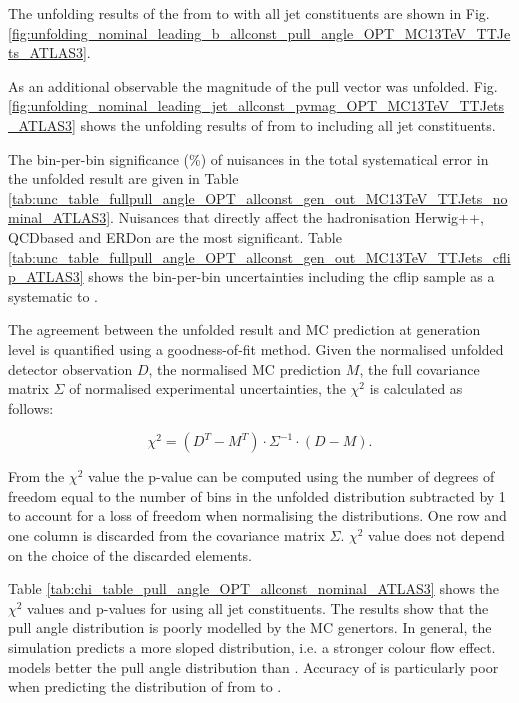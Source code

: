 The unfolding results of the \pullangle from \leadingb to \scndleadingb with all jet constituents are shown in Fig. \ref{fig:unfolding_nominal_leading_b_allconst_pull_angle_OPT_MC13TeV_TTJets_ATLAS3}.

As an additional observable the magnitude of the pull vector \pvmag was unfolded. Fig. \ref{fig:unfolding_nominal_leading_jet_allconst_pvmag_OPT_MC13TeV_TTJets_ATLAS3} shows the unfolding results of \pvmag from \leadingjet to \scndleadingjet including all jet constituents.

The bin-per-bin significance (\%) of nuisances in the total systematical error in the unfolded result are given in Table \ref{tab:unc_table_fullpull_angle_OPT_allconst_gen_out_MC13TeV_TTJets_nominal_ATLAS3}. Nuisances that directly affect the hadronisation \ttbar Herwig++, \ttbar QCDbased and \ttbar ERDon are the most significant. Table \ref{tab:unc_table_fullpull_angle_OPT_allconst_gen_out_MC13TeV_TTJets_cflip_ATLAS3} shows the bin-per-bin uncertainties including the \ttbar cflip sample as a systematic to \ttbar.

The agreement between the unfolded result and MC prediction at generation level is quantified using a goodness-of-fit method. Given the normalised unfolded detector observation $D$, the normalised MC prediction $M$, the full covariance matrix $\Sigma$ of normalised experimental uncertainties, the $\chi^{2}$ is calculated as follows:

\begin{equation}
  \chi^{2}=(D^{T}-M^{T})\cdot\Sigma^{-1}\cdot(D-M).
  \label{eq:chi2}
\end{equation}

From the $\chi^{2}$ value the p-value can be computed using the number of degrees of freedom equal to the number of bins in the unfolded distribution subtracted by 1 to account for a loss of freedom when normalising the distributions. One row and one column is discarded from the covariance matrix $\Sigma$. $\chi^{2}$ value does not depend on the choice of the discarded elements.

Table \ref{tab:chi_table_pull_angle_OPT_allconst_nominal_ATLAS3} shows the $\chi^{2}$ values and p-values for \pullangle using all jet constituents. The results show that the pull angle distribution is poorly modelled by the MC genertors. In general, the simulation predicts a more sloped distribution, i.e. a stronger colour flow effect. \HERWIGpp models better the pull angle distribution than . Accuracy of  is particularly poor when predicting the distribution of \pullangle from \scndleadingjet to \leadingjet.

